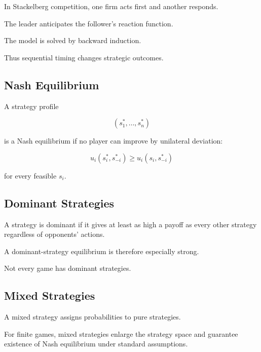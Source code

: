 In Stackelberg competition, one firm acts first and another responds.

The leader anticipates the follower's reaction function.

The model is solved by backward induction.

Thus sequential timing changes strategic outcomes.

\subsection{Nash Equilibrium}
\label{subsec:nash-equilibrium-economics}

A strategy profile

\[
\boxed{
(s_1^*,\ldots,s_n^*)
}
\]

is a Nash equilibrium if no player can improve by unilateral deviation:

\[
\boxed{
u_i(s_i^*,s_{-i}^*)
\geq
u_i(s_i,s_{-i}^*)
}
\]

for every feasible \(s_i\).

\subsection{Dominant Strategies}
\label{subsec:dominant-strategies}

A strategy is dominant if it gives at least as high a payoff as every other
strategy regardless of opponents' actions.

A dominant-strategy equilibrium is therefore especially strong.

Not every game has dominant strategies.

\subsection{Mixed Strategies}
\label{subsec:mixed-strategies-economics}

A mixed strategy assigns probabilities to pure strategies.

For finite games, mixed strategies enlarge the strategy space and guarantee
existence of Nash equilibrium under standard assumptions.

